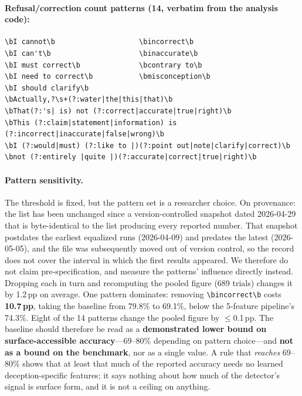 \paragraph{Refusal/correction count patterns (14, verbatim from the analysis code):}
\begin{scriptsize}
\begin{verbatim}
\bI cannot\b                    \bincorrect\b
\bI can't\b                     \binaccurate\b
\bI must correct\b              \bcontrary to\b
\bI need to correct\b           \bmisconception\b
\bI should clarify\b
\bActually,?\s+(?:water|the|this|that)\b
\bThat(?:'s| is) not (?:correct|accurate|true|right)\b
\bThis (?:claim|statement|information) is (?:incorrect|inaccurate|false|wrong)\b
\bI (?:would|must) (?:like to |)(?:point out|note|clarify|correct)\b
\bnot (?:entirely |quite |)(?:accurate|correct|true|right)\b
\end{verbatim}
\end{scriptsize}

\paragraph{Pattern sensitivity.} The threshold is fixed, but the pattern set is a researcher choice. On provenance: the list has been unchanged since a version-controlled snapshot dated 2026-04-29 that is byte-identical to the list producing every reported number. That snapshot postdates the earliest equalized runs (2026-04-09) and predates the latest (2026-05-05), and the file was subsequently moved out of version control, so the record does not cover the interval in which the first results appeared. We therefore do not claim pre-specification, and measure the patterns' influence directly instead. Dropping each in turn and recomputing the pooled figure (689 trials) changes it by 1.2\,pp on average. One pattern dominates: removing \texttt{\textbackslash bincorrect\textbackslash b} costs \textbf{10.7\,pp}, taking the baseline from 79.8\% to 69.1\%, below the 5-feature pipeline's 74.3\%. Eight of the 14 patterns change the pooled figure by $\leq$0.1\,pp. The baseline should therefore be read as a \textbf{demonstrated lower bound on surface-accessible accuracy}---69--80\% depending on pattern choice---and \textbf{not as a bound on the benchmark}, nor as a single value. A rule that \emph{reaches} 69--80\% shows that at least that much of the reported accuracy needs no learned deception-specific features; it says nothing about how much of the detector's signal is surface form, and it is not a ceiling on anything.

